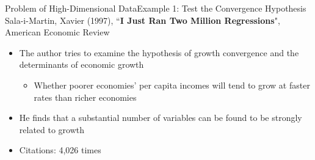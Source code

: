 \documentclass[dvipsnames,hyperref={pdfpagelabels=false}]{beamer}
\begin{document}
	
	
	
	
	
	
	
	
	
	\begin{frame}{Problem of High-Dimensional Data}{Example 1: Test the Convergence Hypothesis}
		Sala-i-Martin, Xavier (1997), ``\textbf{I Just Ran Two Million Regressions}", American Economic Review
		
					\vspace{0.2cm}
		\begin{itemize}	
			\item The author tries to examine the hypothesis of growth convergence and the determinants of economic growth 
			\vspace{0.2cm}
			\begin{itemize}
				\item Whether poorer economies' per capita incomes will tend to grow at faster rates than richer economies
			\end{itemize}
			\vspace{0.2cm}
			\item He finds that a substantial number of variables can be found to be strongly related to growth
			\vspace{0.2cm}
			\item Citations: 4,026 times
			
		\end{itemize}
	\end{frame}
	
	
	
\end{document}
